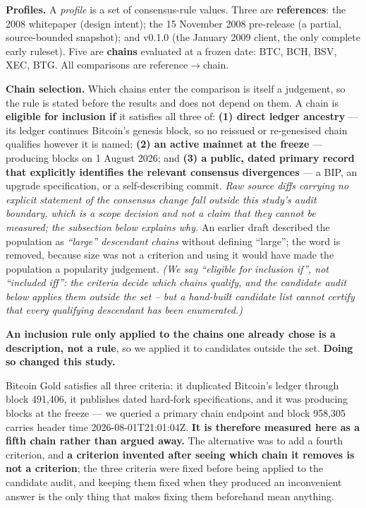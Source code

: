 \documentclass[
]{article}
\begin{document}
\textbf{Profiles.} A \emph{profile} is a set of consensus-rule values.
Three are \textbf{references}: the 2008 whitepaper \citep{nakamoto2008}
(design intent); the 15 November 2008 pre-release \citep{sni_code} (a
partial, source-bounded snapshot); and v0.1.0 \citep{sni_code} (the
January 2009 client, the only complete early ruleset). Five are
\textbf{chains} evaluated at a frozen date: BTC, BCH, BSV, XEC, BTG. All
comparisons are reference\(\rightarrow\)chain.

\textbf{Chain selection.} Which chains enter the comparison is itself a
judgement, so the rule is stated before the results and does not depend
on them. A chain is \textbf{eligible for inclusion if} it satisfies all
three of: \textbf{(1) direct ledger ancestry} --- its ledger continues
Bitcoin's genesis block, so no reissued or re-genesised chain qualifies
however it is named; \textbf{(2) an active mainnet at the freeze} ---
producing blocks on 1 August 2026; and \textbf{(3) a public, dated
primary record that explicitly identifies the relevant consensus
divergences} --- a BIP, an upgrade specification, or a self-describing
commit. \emph{Raw source diffs carrying no explicit statement of the
consensus change fall outside this study's audit boundary, which is a
scope decision and not a claim that they cannot be measured; the
subsection below explains why.} An earlier draft described the
population as \emph{``large'' descendant chains} without defining
``large''; the word is removed, because size was not a criterion and
using it would have made the population a popularity judgement.
\emph{(We say ``eligible for inclusion if'', not ``included iff'': the
criteria decide which chains qualify, and the candidate audit below
applies them outside the set -- but a hand-built candidate list cannot
certify that every qualifying descendant has been enumerated.)}

\textbf{An inclusion rule only applied to the chains one already chose
is a description, not a rule}, so we applied it to candidates outside
the set. \textbf{Doing so changed this study.}

Bitcoin Gold satisfies all three criteria: it duplicated Bitcoin's
ledger through block 491,406, it publishes dated hard-fork
specifications, and it was producing blocks at the freeze --- we queried
a primary chain endpoint and block 958,305 carries header time
2026-08-01T21:01:04Z. \textbf{It is therefore measured here as a fifth
chain rather than argued away.} The alternative was to add a fourth
criterion, and \textbf{a criterion invented after seeing which chain it
removes is not a criterion}; the three criteria were fixed before being
applied to the candidate audit, and keeping them fixed when they
produced an inconvenient answer is the only thing that makes fixing them
beforehand mean anything.
\end{document}
